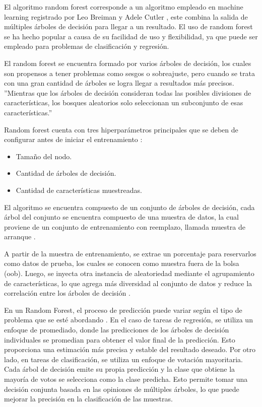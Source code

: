 El algoritmo random forest corresponde a un algoritmo empleado en machine learning registrado por Leo Breiman y Adele Cutler \cite{random-forest}, este combina la salida de múltiples árboles de decisión para llegar a un resultado. El uso de random forest se ha hecho popular a causa de su facilidad de uso y flexibilidad, ya que puede ser empleado para problemas de clasificación y regresión.

El random forest se encuentra formado por varios árboles de decisión, los cuales son propensos a tener problemas como sesgos o sobreajuste, pero cuando se trata con una gran cantidad de árboles se logra llegar a resultados más precisos. ''Mientras que los árboles de decisión consideran todas las posibles divisiones de características, los bosques aleatorios solo seleccionan un subconjunto de esas características.'' \cite{random-forest}

Random forest cuenta con tres hiperparámetros principales que se deben de configurar antes de iniciar el entrenamiento \cite{random-forest}:

\begin{itemize}
    \item Tamaño del nodo.
    \item Cantidad de árboles de decisión.
    \item Cantidad de características muestreadas. 
\end{itemize}

El algoritmo se encuentra compuesto de un conjunto de árboles de decisión, cada árbol del conjunto se encuentra compuesto de una muestra de datos, la cual proviene de un conjunto de entrenamiento con reemplazo, llamada muestra de arranque \cite{random-forest}.

A partir de la muestra de entrenamiento, se extrae un porcentaje para reservarlos como datos de prueba, los cuales se conocen como muestra fuera de la bolsa (oob). Luego, se inyecta otra instancia de aleatoriedad mediante el agrupamiento de características, lo que agrega más diversidad al conjunto de datos y reduce la correlación entre los árboles de decisión \cite{random-forest}.

En un Random Forest, el proceso de predicción puede variar según el tipo de problema que se esté abordando \cite{random-forest}. En el caso de tareas de regresión, se utiliza un enfoque de promediado, donde las predicciones de los árboles de decisión individuales se promedian para obtener el valor final de la predicción. Esto proporciona una estimación más precisa y estable del resultado deseado. Por otro lado, en tareas de clasificación, se utiliza un enfoque de votación mayoritaria. Cada árbol de decisión emite su propia predicción y la clase que obtiene la mayoría de votos se selecciona como la clase predicha. Esto permite tomar una decisión conjunta basada en las opiniones de múltiples árboles, lo que puede mejorar la precisión en la clasificación de las muestras.

